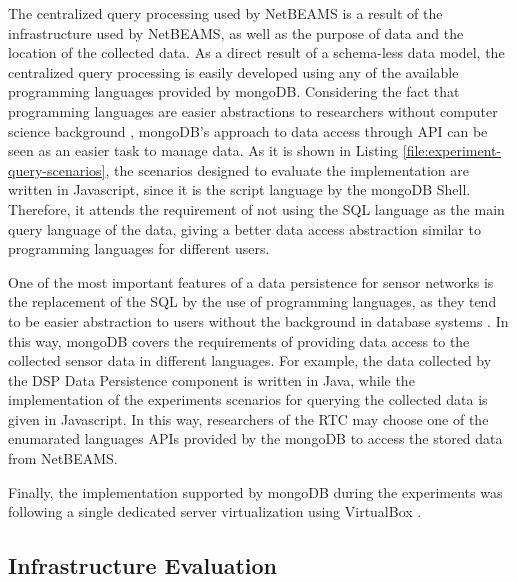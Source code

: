 The centralized query processing used by NetBEAMS is a result of the
infrastructure used by NetBEAMS, as well as the purpose of data and the
location of the collected data. As a direct result of a schema-less data
model, the centralized query processing is easily developed using any of the
available programming languages provided by mongoDB. Considering the fact that
programming languages are easier abstractions to researchers without computer
science background \cite{sn-programming-language}, mongoDB's approach to data
access through API can be seen as an easier task to manage data. As it is shown
in Listing \ref{file:experiment-query-scenarios}, the scenarios designed to
evaluate the implementation are written in Javascript, since it is the script
language by the mongoDB Shell. Therefore, it attends the requirement of not
using the SQL language as the main query language of the data, giving a better
data access abstraction similar to programming languages for different users.

One of the most important features of a data persistence for sensor
networks is the replacement of the SQL by the use of programming
languages, as they tend to be easier abstraction to users without the
background in database systems \cite{sn-programming-language}. In this way,
mongoDB covers the requirements of providing data access to the collected
sensor data in different languages. For example, the data collected by the DSP
Data Persistence component is written in Java, while the implementation of the
experiments scenarios for querying the collected data is given in Javascript. In
this way, researchers of the RTC may choose one of the enumarated languages
APIs provided by the mongoDB to access the stored data from NetBEAMS.

Finally, the implementation supported by mongoDB during the experiments was
following a single dedicated server virtualization using VirtualBox 
\cite{virtualization}.

\subsection{Infrastructure Evaluation}

